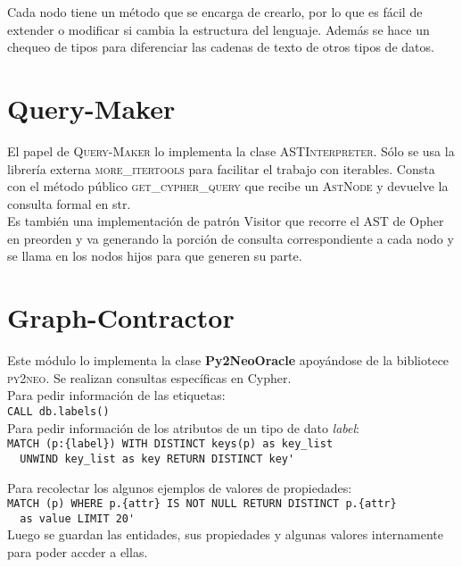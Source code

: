 Cada nodo tiene un m\'etodo que se encarga de crearlo, por lo que es f\'acil de extender o modificar si cambia la estructura del lenguaje. Adem\'as se hace un chequeo de tipos para diferenciar las cadenas de texto de otros tipos de datos.


\section{Query-Maker}

El papel de \textsc{Query-Maker} lo implementa la clase \textsc{ASTInterpreter}. S\'olo se usa la librer\'ia externa \textsc{more_itertools} para facilitar el trabajo con iterables. Consta con el m\'etodo p\'ublico \textsc{get_cypher_query} que recibe un \textsc{AstNode} y devuelve la consulta formal en str.\\

Es tambi\'en una implementaci\'on de patr\'on Visitor que recorre el AST de Opher en preorden y va generando la porci\'on de consulta correspondiente a cada nodo y se llama en los nodos hijos para que generen su parte.\\

\section{Graph-Contractor}
\label{graphc}

Este m\'odulo lo implementa la clase \textbf{Py2NeoOracle} apoy\'andose de la bibliotece \textsc{py2neo}. Se realizan consultas espec\'ificas en Cypher.\\

Para pedir informaci\'on de las etiquetas: \\
\verb|CALL db.labels()| \\

Para pedir informaci\'on de los atributos de un tipo de dato \textit{label}: \\
\verb|MATCH (p:{label}) WITH DISTINCT keys(p) as key_list|\\
\verb|  UNWIND key_list as key RETURN DISTINCT key'|

Para recolectar los algunos ejemplos de valores de propiedades:\\
\verb|MATCH (p) WHERE p.{attr} IS NOT NULL RETURN DISTINCT p.{attr}|\\ 
\verb|  as value LIMIT 20'|\\


Luego se guardan las entidades, sus propiedades y algunas valores internamente para poder accder a ellas.



